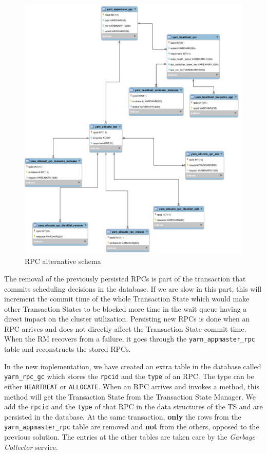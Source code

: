 \begin{figure}
\centering
\includegraphics[scale=0.3]{resources/images/Implementation/rpc_fk_alternate_schema.png}
\caption{RPC alternative schema}
\label{fig:impl_fk_alternate_schema}
\end{figure}

The removal of the previously persisted RPCs is part of the
transaction that commits scheduling decisions in the database. If we
are slow in this part, this will increment the commit time of the
whole Transaction State which would make other Transaction States to
be blocked more time in the wait queue having a direct impact on the
cluster utilization. Persisting new RPCs is done when an RPC arrives
and does not directly affect the Transaction State commit time. When
the RM recovers from a failure, it goes through the
\texttt{yarn\_appmaster\_rpc} table and reconstructs the stored RPCs.

In the new implementation, we have created an extra table in the
database called \texttt{yarn\_rpc\_gc} which stores the \texttt{rpcid}
and the \texttt{type} of an RPC. The type can be either
\texttt{HEARTBEAT} or \texttt{ALLOCATE}. When an RPC arrives and
invokes a method, this method will get the Transaction State from the
Transaction State Manager. We add the \texttt{rpcid} and the
\texttt{type} of that RPC in the data structures of the TS and are
persisted in the database. At the same transaction, \textbf{only} the rows from
the \texttt{yarn\_appmaster\_rpc} table are removed and \textbf{not}
from the others, opposed to the previous solution. The entries at the other tables are taken care by the
\emph{Garbage Collector} service.

